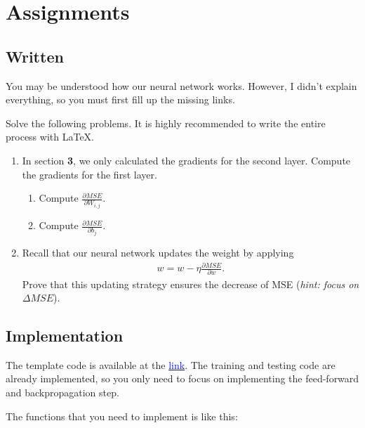 \documentclass{oblivoir}
\begin{document}
\section{Assignments}

\subsection{Written}

You may be understood how our neural network works. However, I didn't explain everything, so you must first fill up the missing links.

Solve the following problems. It is highly recommended to write the entire process with \LaTeX. 

\begin{enumerate}
    \item In section \textbf{3}, we only calculated the gradients for the second layer. Compute the gradients for the first layer.
    \begin{enumerate}
        \item Compute $\frac{\partial MSE}{\partial W_{i,j}}$.
        \item Compute $\frac{\partial MSE}{\partial b_j}$.
    \end{enumerate}
    \item Recall that our neural network updates the weight by applying
    \begin{align*}
        w = w - \eta \frac{\partial MSE}{\partial w}. 
    \end{align*}
    Prove that this updating strategy ensures the decrease of MSE (\textit{hint: focus on $\Delta MSE$}).
\end{enumerate}

\subsection{Implementation}

The template code is available at the \href{https://jeonhyun97.github.io/cpp_4_undergraduates/cpp/assn/assn3/assn3.zip}{\textcolor{blue}{link}}. The training and testing code are already implemented, so you only need to focus on implementing the feed-forward and backpropagation step. 

The functions that you need to implement is like this:
\end{document}
